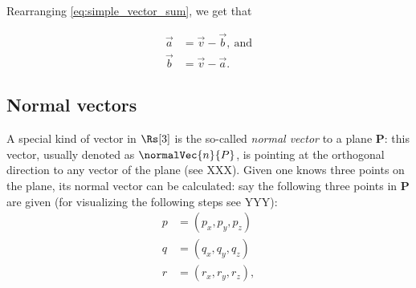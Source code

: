 Rearranging \autoref{eq:simple_vector_sum}, we get that

\begin{align}
	\vec{a} &= \vec{v}-\vec{b},\ \text{and}\nonumber\\
	\vec{b} &= \vec{v}-\vec{a}.
\end{align}


\subsection{Normal vectors}
A special kind of vector in $\Rs[3]$ is the so-called \emph{normal vector} to a plane $\mathbf{P}$: this vector, usually denoted as $\normalVec{n}{P}$, is pointing at the orthogonal direction to any vector of the plane (see XXX). Given one knows three points on the plane, its normal vector can be calculated: say the following three points in $\mathbf{P}$ are given (for visualizing the following steps see YYY):
\begin{align}
	p &= (p_{x}, p_{y}, p_{z})\nonumber\\
	q &= (q_{x}, q_{y}, q_{z})\nonumber\\
	r &= (r_{x}, r_{y}, r_{z}),
	\label{eq:three points in a plane}
\end{align}

